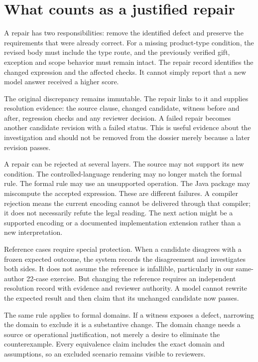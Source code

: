 \section{What counts as a justified repair}
\label{merge:M06:18}


A repair has two responsibilities: remove the identified defect and preserve the
requirements that were already correct. For a missing product-type condition,
the revised body must include the type route, and the previously verified gift,
exception and scope behavior must remain intact. The repair record identifies the
changed expression and the affected checks. It cannot simply report that a new
model answer received a higher score.

The original discrepancy remains immutable. The repair links to it and supplies
resolution evidence: the source clause, changed candidate, witness before and
after, regression checks and any reviewer decision. A failed repair becomes
another candidate revision with a failed status. This is useful evidence about
the investigation and should not be removed from the dossier merely because a
later revision passes.

A repair can be rejected at several layers. The source may not support its new
condition. The controlled-language rendering may no longer match the formal
rule. The formal rule may use an unsupported operation. The Java package may
miscompute the accepted expression. These are different failures. A compiler
rejection means the current encoding cannot be delivered through that compiler;
it does not necessarily refute the legal reading. The next action might be a
supported encoding or a documented implementation extension rather than a new
interpretation.


Reference cases require special protection. When a candidate disagrees with a
frozen expected outcome, the system records the disagreement and investigates
both sides. It does not assume the reference is infallible, particularly in our
same-author 22-case exercise. But changing the reference requires an independent
resolution record with evidence and reviewer authority. A model cannot rewrite
the expected result and then claim that its unchanged candidate now passes.

The same rule applies to formal domains. If a witness exposes a defect, narrowing
the domain to exclude it is a substantive change. The domain change needs a
source or operational justification, not merely a desire to eliminate the
counterexample. Every equivalence claim includes the exact domain and assumptions,
so an excluded scenario remains visible to reviewers.

